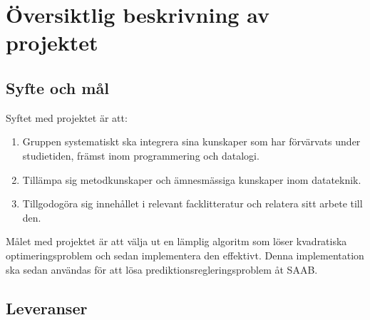 \section{Översiktlig beskrivning av projektet}


\subsection{Syfte och mål}
Syftet med projektet är att:
\begin{enumerate}
 \item Gruppen systematiskt ska integrera sina kunskaper som har förvärvats under studietiden, främst inom programmering och datalogi. 
 \item Tillämpa sig  metodkunskaper och ämnesmässiga kunskaper inom datateknik.
 \item Tillgodogöra sig innehållet i relevant facklitteratur och relatera sitt arbete till den.
\end{enumerate}

\raggedright Målet med projektet är att välja ut en lämplig algoritm som löser kvadratiska optimeringsproblem och sedan implementera den effektivt. Denna implementation ska sedan användas för att lösa prediktionsregleringsproblem åt SAAB. 

\subsection{Leveranser}

